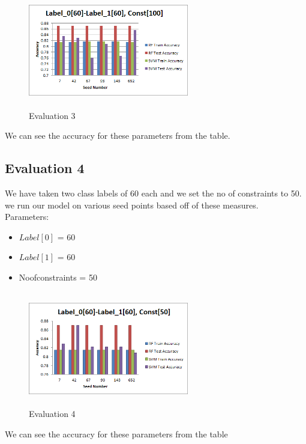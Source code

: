 \documentclass[10pt, conference, compsocconf]{IEEEtran}
\begin{document}
\begin{figure}[H]
\centering
\includegraphics[width=7cm,height=5cm,keepaspectratio]{3.png}
\caption{\label{fig:2-Evaluation 3} Evaluation 3}
\end{figure}

We can see the accuracy for these parameters from the table.


\subsection{Evaluation 4}
We have taken two class labels of 60 each and we set the no of constraints to 50.
we run our model on various seed points based off of these measures.\\
Parameters:
\begin{itemize}
\item $Label[0]$ = 60
\item $Label[1]$ = 60
\item Noofconstraints = 50
\end{itemize}

\begin{figure}[H]
\centering
\includegraphics[width=7cm,height=5cm,keepaspectratio]{4.png}
\caption{\label{fig:2-Evaluation 4} Evaluation 4}
\end{figure}

We can see the accuracy for these parameters from the table
\end{document}
